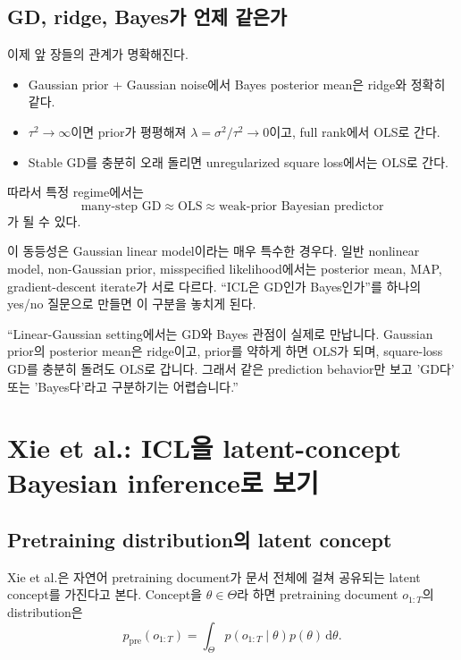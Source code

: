 \documentclass[11pt,a4paper,oneside,openany]{memoir}
\newcommand{\dd}{\,\mathrm{d}}
\theoremstyle{definition}
\begin{document}
\section{GD, ridge, Bayes가 언제 같은가}

이제 앞 장들의 관계가 명확해진다.

\begin{itemize}
\item Gaussian prior + Gaussian noise에서 Bayes posterior mean은 ridge와 정확히 같다.
\item $\tau^2\to\infty$이면 prior가 평평해져 $\lambda=\sigma^2/\tau^2\to0$이고, full rank에서 OLS로 간다.
\item Stable GD를 충분히 오래 돌리면 unregularized square loss에서는 OLS로 간다.
\end{itemize}

따라서 특정 regime에서는
\[
\text{many-step GD}
\approx
\text{OLS}
\approx
\text{weak-prior Bayesian predictor}
\]
가 될 수 있다.

\begin{warningbox}
이 동등성은 Gaussian linear model이라는 매우 특수한 경우다. 일반 nonlinear model, non-Gaussian prior, misspecified likelihood에서는 posterior mean, MAP, gradient-descent iterate가 서로 다르다. ``ICL은 GD인가 Bayes인가''를 하나의 yes/no 질문으로 만들면 이 구분을 놓치게 된다.
\end{warningbox}

\begin{presentbox}
``Linear-Gaussian setting에서는 GD와 Bayes 관점이 실제로 만납니다. Gaussian prior의 posterior mean은 ridge이고, prior를 약하게 하면 OLS가 되며, square-loss GD를 충분히 돌려도 OLS로 갑니다. 그래서 같은 prediction behavior만 보고 'GD다' 또는 'Bayes다'라고 구분하기는 어렵습니다.''
\end{presentbox}

\chapter{Xie et al.: ICL을 latent-concept Bayesian inference로 보기}

\section{Pretraining distribution의 latent concept}

Xie et al.은 자연어 pretraining document가 문서 전체에 걸쳐 공유되는 latent concept를 가진다고 본다.
Concept을 $\theta\in\Theta$라 하면 pretraining document $o_{1:T}$의 distribution은
\[
\boxed{
p_{\mathrm{pre}}(o_{1:T})
=
\int_\Theta
p(o_{1:T}\mid\theta)p(\theta)\dd\theta
}.
\]
\end{document}
